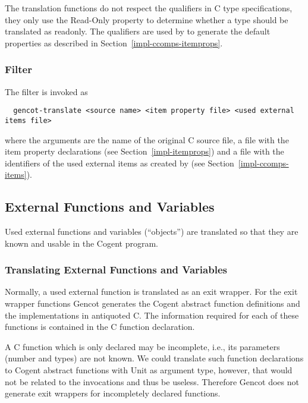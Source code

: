 The translation functions do not respect the  qualifiers in C type specifications, they only use the 
Read-Only property to determine whether a type should be translated as readonly. The  qualifiers are 
used by  to generate the default properties as described in Section~\ref{impl-ccomps-itemprops}. 

\subsubsection{Filter }

The filter  is invoked as
\begin{verbatim}
  gencot-translate <source name> <item property file> <used external items file>
\end{verbatim}
where the arguments are the name of the original C source file, a file with the item property declarations (see 
Section~\ref{impl-itemprops}) and a file with the identifiers of the used external items as created 
by  (see Section~\ref{impl-ccomps-items}).

\subsection{External Functions and Variables}
\label{impl-ccomps-externs}

Used external functions and variables (``objects'') are translated so that they are known and usable
in the Cogent program.

\subsubsection{Translating External Functions and Variables}

Normally, a used external function is translated as an exit wrapper.
For the exit wrapper functions Gencot generates the Cogent abstract function definitions and the implementations
in antiquoted C. 
The information required for each of these functions is contained in the C function declaration.

A C function which is only declared may be incomplete, i.e., its parameters (number and types) are not known. 
We could translate such function declarations to Cogent abstract functions with Unit as argument type, however,
that would not be related to the invocations and thus be useless. Therefore Gencot does not generate exit 
wrappers for incompletely declared functions.

